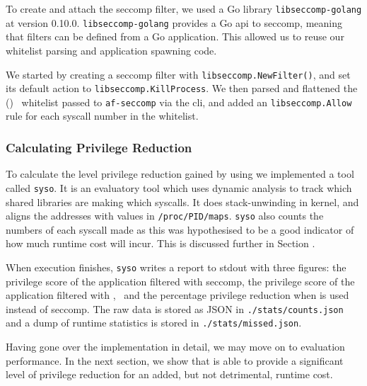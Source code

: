 To create and attach the seccomp filter, we used a Go library 
\texttt{libseccomp-golang} at version 0.10.0. \texttt{libseccomp-golang}
provides a Go \ac{api} to seccomp, meaning that filters can be defined from a
Go application. This allowed us to reuse our whitelist parsing and application
spawning code.

We started by creating a seccomp filter with \texttt{libseccomp.NewFilter()}, 
and set its default action to \texttt{libseccomp.KillProcess}. We then parsed
and flattened the (\afss)~ whitelist passed to \texttt{af-seccomp} via the
\ac{cli}, and added an \texttt{libseccomp.Allow} rule for each syscall number in
the whitelist.

\subsubsection{Calculating Privilege Reduction}


To calculate the level privilege reduction gained by using \af we implemented a
tool called \texttt{syso}. It is an evaluatory tool which uses dynamic analysis
to track which shared libraries are making which syscalls. It does
stack-unwinding in kernel, and aligns the addresses with values in
\texttt{/proc/PID/maps}. \texttt{syso} also counts the numbers of each syscall 
made as this was hypothesised to be a good indicator of how much runtime cost
\af will incur. This is discussed further in Section .

When execution finishes, \texttt{syso} writes a report to \ac{stdout} with three
figures: the privilege score of the application filtered with seccomp, the
privilege score of the application filtered with \afss,~ and the percentage
privilege reduction when \af is used instead of seccomp. The raw data is stored
as JSON in \texttt{./stats/counts.json} and a dump of runtime statistics is
stored in \texttt{./stats/missed.json}.

Having gone over the implementation in detail, we may move on to evaluation
\afg performance. In the next section, we show that \af is able to provide a
significant level of privilege reduction for an added, but not detrimental,
runtime cost.
